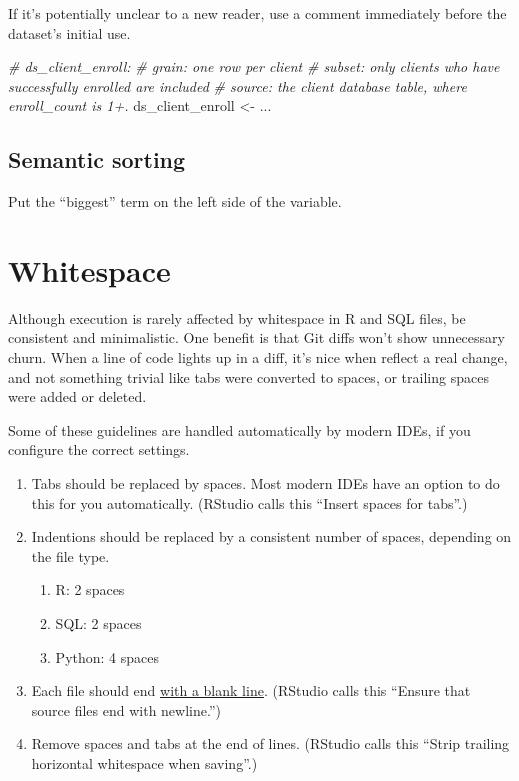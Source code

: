 \documentclass[
]{book}
\newenvironment{Shaded}{\begin{snugshade}}{\end{snugshade}}
\newcommand{\CommentTok}[1]{\textcolor[rgb]{0.56,0.35,0.01}{\textit{#1}}}
\newcommand{\NormalTok}[1]{#1}
\newcommand{\StringTok}[1]{\textcolor[rgb]{0.31,0.60,0.02}{#1}}
\providecommand{\tightlist}{%
  \setlength{\itemsep}{0pt}\setlength{\parskip}{0pt}}
\begin{document}
If it's potentially unclear to a new reader, use a comment immediately before the dataset's initial use.

\begin{Shaded}
\begin{Highlighting}[]
\CommentTok{\# \textasciigrave{}ds\_client\_enroll\textasciigrave{}:}
\CommentTok{\#    grain: one row per client}
\CommentTok{\#    subset: only clients who have successfully enrolled are included}
\CommentTok{\#    source: the \textasciigrave{}client\textasciigrave{} database table, where \textasciigrave{}enroll\_count\textasciigrave{} is 1+.}
\NormalTok{ds\_client\_enroll <{-}}\StringTok{ }\NormalTok{...}
\end{Highlighting}
\end{Shaded}

\hypertarget{style-naming-semantic}{%
\subsection{Semantic sorting}\label{style-naming-semantic}}

Put the ``biggest'' term on the left side of the variable.

\hypertarget{style-whitespace}{%
\section{Whitespace}\label{style-whitespace}}

Although execution is rarely affected by whitespace in R and SQL files, be consistent and minimalistic. One benefit is that Git diffs won't show unnecessary churn. When a line of code lights up in a diff, it's nice when reflect a real change, and not something trivial like tabs were converted to spaces, or trailing spaces were added or deleted.

Some of these guidelines are handled automatically by modern IDEs, if you configure the correct settings.

\begin{enumerate}
\def\labelenumi{\arabic{enumi}.}
\tightlist
\item
  Tabs should be replaced by spaces. Most modern IDEs have an option to do this for you automatically. (RStudio calls this ``Insert spaces for tabs''.)
\item
  Indentions should be replaced by a consistent number of spaces, depending on the file type.

  \begin{enumerate}
  \def\labelenumii{\arabic{enumii}.}
  \tightlist
  \item
    R: 2 spaces
  \item
    SQL: 2 spaces
  \item
    Python: 4 spaces
  \end{enumerate}
\item
  Each file should end \href{https://unix.stackexchange.com/a/18746/104659}{with a blank line}. (RStudio calls this ``Ensure that source files end with newline.'')
\item
  Remove spaces and tabs at the end of lines. (RStudio calls this ``Strip trailing horizontal whitespace when saving''.)
\end{enumerate}
\end{document}
